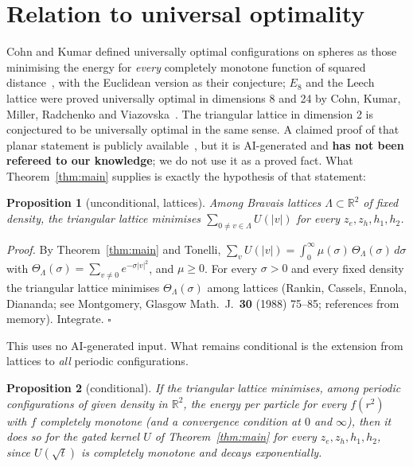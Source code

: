 \documentclass[11pt,a4paper]{article}
\newtheorem{proposition}{Proposition}
\theoremstyle{remark}
\newcommand{\R}{\mathbb{R}}
\begin{document}
\section{Relation to universal optimality}

Cohn and Kumar defined universally optimal configurations on spheres as those minimising the energy for \emph{every} completely monotone function
of squared distance~\cite{CohnKumar2007}, with the Euclidean version as their conjecture; $E_8$ and the Leech lattice were proved universally optimal in dimensions 8 and 24
by Cohn, Kumar, Miller, Radchenko and Viazovska~\cite{CKMRV2022}. The triangular lattice in dimension 2 is conjectured to be
universally optimal in the same sense. A claimed proof of that planar statement is publicly available~\cite{OpenAI2026}, but it is
AI-generated and \textbf{has not been refereed to our knowledge}; we do not use it as a proved fact. What Theorem~\ref{thm:main}
supplies is exactly the hypothesis of that statement:

\begin{proposition}[unconditional, lattices]\label{prop:lat}
Among Bravais lattices $\Lambda\subset\R^2$ of fixed density, the triangular lattice minimises $\sum_{0\ne v\in\Lambda}U(|v|)$ for every
$z_e,z_h,h_1,h_2$.
\end{proposition}
\emph{Proof.} By Theorem~\ref{thm:main} and Tonelli, $\sum_vU(|v|)=\int_0^\infty\mu(\sigma)\,\Theta_\Lambda(\sigma)\,d\sigma$ with
$\Theta_\Lambda(\sigma)=\sum_{v\ne0}e^{-\sigma|v|^2}$, and $\mu\ge0$. For every $\sigma>0$ and every fixed density the triangular lattice minimises
$\Theta_\Lambda(\sigma)$ among lattices (Rankin, Cassels, Ennola, Diananda; see Montgomery, Glasgow Math.\ J.\ \textbf{30} (1988) 75--85;
references from memory). Integrate. \hfill$\square$

This uses no AI-generated input. What remains conditional is the extension from lattices to \emph{all} periodic configurations.

\begin{proposition}[conditional]
\emph{If} the triangular lattice minimises, among periodic configurations of given density in $\R^2$, the energy per particle for every
$f(r^2)$ with $f$ completely monotone (and a convergence condition at $0$ and $\infty$), \emph{then} it does so for the gated kernel
$U$ of Theorem~\ref{thm:main} for every $z_e,z_h,h_1,h_2$, since $U(\sqrt t)$ is completely monotone and decays exponentially.
\end{proposition}
\end{document}
